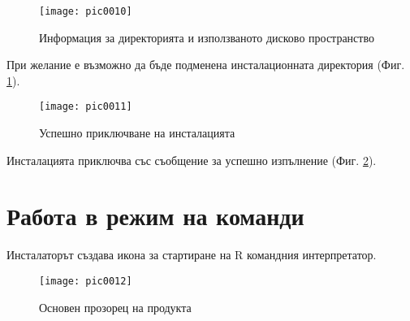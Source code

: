 \begin{figure}[h]
  \centering
  \texttt{[image: pic0010]}
  \caption{Информация за директорията и използваното дисково пространство}
\label{figure0010}
\end{figure}
\FloatBarrier

При желание е възможно да бъде подменена инсталационната директория (Фиг. \ref{figure0010}).

\begin{figure}[h]
  \centering
  \texttt{[image: pic0011]}
  \caption{Успешно приключване на инсталацията}
\label{figure0011}
\end{figure}
\FloatBarrier

Инсталацията приключва със съобщение за успешно изпълнение (Фиг. \ref{figure0011}).

\section{Работа в режим на команди}

Инсталаторът създава икона за стартиране на R командния интерпретатор.

\begin{figure}[h]
  \centering
  \texttt{[image: pic0012]}
  \caption{Основен прозорец на продукта}
\label{figure0012}
\end{figure}
\FloatBarrier

